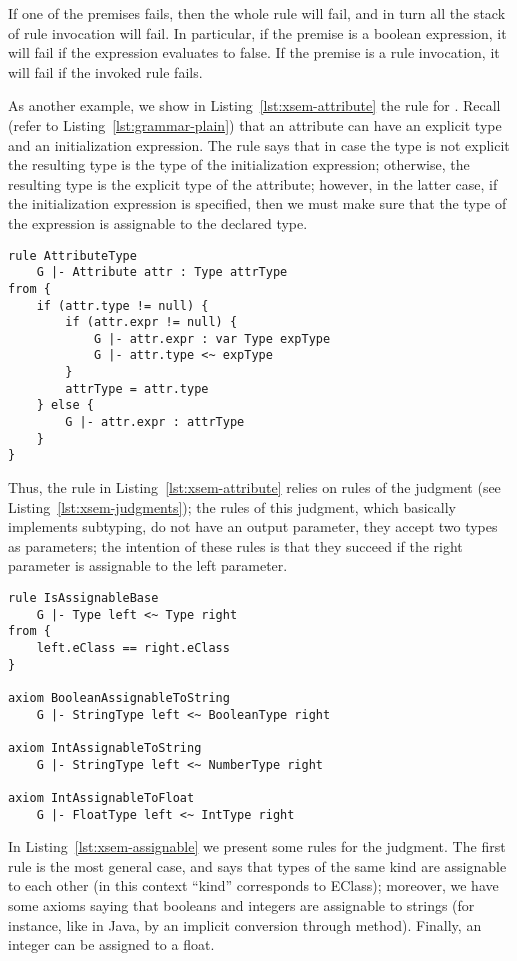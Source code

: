 If one of the premises fails, then the whole rule will fail, and in turn all the
stack of rule invocation will fail.  In particular, if the premise is a boolean
expression, it will fail if the expression evaluates to false.  If the premise
is a rule invocation, it will fail if the invoked rule fails.

As another example, we show in Listing~\ref{lst:xsem-attribute} the rule for
.  Recall (refer to Listing~\ref{lst:grammar-plain}) that an
attribute can have an explicit type and an initialization expression. The rule
says that in case the type is not explicit the resulting type is the type of the
initialization expression; otherwise, the resulting type is the explicit type of
the attribute; however, in the latter case, if the initialization expression is
specified, then we must make sure that the type of the expression is assignable
to the declared type.

\begin{lstlisting}[language=xsemantics,float,label=lst:xsem-attribute,caption=Type
rule for \mytt{Attribute}.] 
rule AttributeType 
	G |- Attribute attr : Type attrType 
from {
	if (attr.type != null) {
		if (attr.expr != null) {
			G |- attr.expr : var Type expType
			G |- attr.type <~ expType
		}
		attrType = attr.type
	} else {
		G |- attr.expr : attrType
	}
}
\end{lstlisting}

Thus, the rule in Listing~\ref{lst:xsem-attribute} relies on rules of the
judgment  (see Listing~\ref{lst:xsem-judgments}); the rules
of this judgment, which basically implements subtyping, do not have an output
parameter, they accept two types as parameters; the intention of these rules is
that they succeed if the right parameter is assignable to the left parameter.

\begin{lstlisting}[language=xsemantics,float,label=lst:xsem-assignable,caption=Some
rules for the \mytt{isAssignable} judgment.] 
rule IsAssignableBase
	G |- Type left <~ Type right
from {
	left.eClass == right.eClass
}

axiom BooleanAssignableToString
	G |- StringType left <~ BooleanType right

axiom IntAssignableToString
	G |- StringType left <~ NumberType right

axiom IntAssignableToFloat
	G |- FloatType left <~ IntType right
\end{lstlisting}

In Listing~\ref{lst:xsem-assignable} we present some rules for the
 judgment.  The first rule is the most general case, and says
that types of the same kind are assignable to each other (in this context
``kind'' corresponds to EClass); moreover, we have some axioms saying that
booleans and integers are assignable to strings (for instance, like in Java, by
an implicit conversion through  method).  Finally, an integer can
be assigned to a float.

